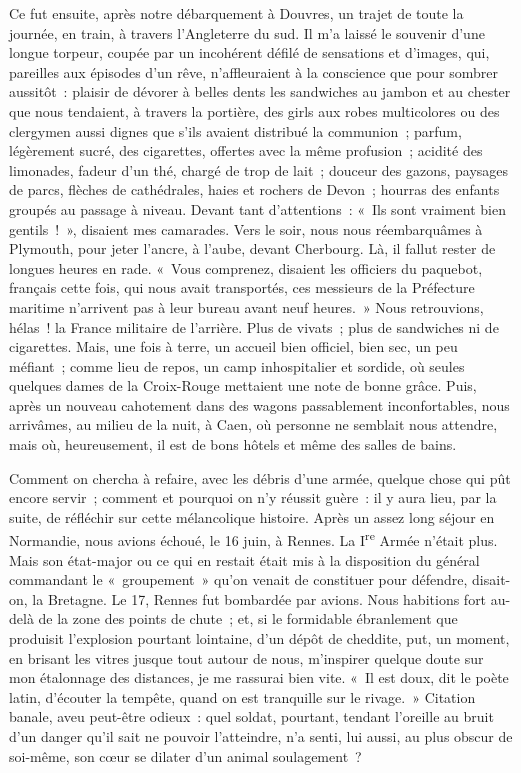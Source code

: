 \documentclass[french,twoside]{book} %
\begin{document}
Ce fut ensuite, après notre débarquement à Douvres, un trajet de toute la journée, en train, à travers l’Angleterre du sud. Il m’a laissé le souvenir d’une longue torpeur, coupée par un incohérent défilé de sensations et d’images, qui, pareilles aux épisodes d’un rêve, n’affleuraient à la conscience que pour sombrer aussitôt : plaisir de dévorer à belles dents les sandwiches au jambon et au chester que nous tendaient, à travers la portière, des girls aux robes multicolores ou des clergymen aussi dignes que s’ils avaient distribué la communion ; parfum, légèrement sucré, des cigarettes, offertes avec la même profusion ; acidité des limonades, fadeur d’un thé, chargé de trop de lait ; douceur des gazons, paysages de   parcs, flèches de cathédrales, haies et rochers de Devon ; hourras des enfants groupés au passage à niveau. Devant tant d’attentions : « Ils sont vraiment bien gentils ! », disaient mes camarades. Vers le soir, nous nous réembarquâmes à Plymouth, pour jeter l’ancre, à l’aube, devant Cherbourg. Là, il fallut rester de longues heures en rade. « Vous comprenez, disaient les officiers du paquebot, français cette fois, qui nous avait transportés, ces messieurs de la Préfecture maritime n’arrivent pas à leur bureau avant neuf heures. » Nous retrouvions, hélas ! la France militaire de l’arrière. Plus de vivats ; plus de sandwiches ni de cigarettes. Mais, une fois à terre, un accueil bien officiel, bien sec, un peu méfiant ; comme lieu de repos, un camp inhospitalier et sordide, où seules quelques dames de la Croix-Rouge mettaient une note de bonne grâce. Puis, après un nouveau cahotement dans des wagons passablement inconfortables, nous arrivâmes, au milieu de la nuit, à Caen, où personne ne semblait nous attendre, mais où, heureusement, il est de bons hôtels et même des salles de bains.\par
Comment on chercha à refaire, avec les débris d’une armée, quelque chose qui pût encore servir ; comment et pourquoi on n’y réussit guère : il y aura lieu, par la suite, de réfléchir sur cette mélancolique histoire. Après un assez long séjour en Normandie, nous avions échoué, le 16 juin, à Rennes. La I\textsuperscript{re} Armée n’était plus. Mais son état-major ou ce qui en restait était mis à la disposition du général commandant le « groupement » qu’on venait de constituer pour défendre, disait-on, la Bretagne. Le 17, Rennes fut bombardée par avions. Nous habitions fort au-delà de la zone des points de chute ; et, si le formidable ébranlement que produisit l’explosion pourtant lointaine, d’un dépôt de cheddite, put, un moment, en brisant les vitres jusque tout autour de nous, m’inspirer quelque doute sur mon étalonnage des distances, je me rassurai bien vite. « Il est doux,   dit le poète latin, d’écouter la tempête, quand on est tranquille sur le rivage. » Citation banale, aveu peut-être odieux : quel soldat, pourtant, tendant l’oreille au bruit d’un danger qu’il sait ne pouvoir l’atteindre, n’a senti, lui aussi, au plus obscur de soi-même, son cœur se dilater d’un animal soulagement ?\par
\end{document}
